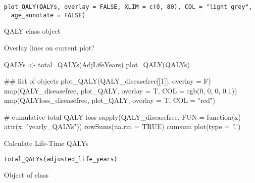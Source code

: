 \documentclass[a4paper]{book}
\begin{document}
%
\begin{Usage}
\begin{verbatim}
plot_QALY(QALYs, overlay = FALSE, XLIM = c(0, 80), COL = "light grey",
  age_annotate = FALSE)
\end{verbatim}
\end{Usage}
%
\begin{Arguments}
\begin{ldescription}
\item[\code{QALYs}] QALY class object

\item[\code{overlay}] Overlay lines on current plot?

\item[\code{age\_annotate}] 
\end{ldescription}
\end{Arguments}
%
\begin{SeeAlso}\relax
{}
\end{SeeAlso}
%
\begin{Examples}
\begin{ExampleCode}
QALYs <- total_QALYs(AdjLifeYears)
plot_QALY(QALYs)

## list of objects
plot_QALY(QALY_diseasefree[[1]], overlay = F)
map(QALY_diseasefree, plot_QALY, overlay = T, COL = rgb(0, 0, 0, 0.1))
map(QALYloss_diseasefree, plot_QALY, overlay = T, COL = "red")

# cumulative total QALY loss
sapply(QALY_diseasefree,
       FUN = function(x) attr(x, "yearly_QALYs")) %
       rowSums(na.rm = TRUE) %
       cumsum %
       plot(type = 'l')

\end{ExampleCode}
\end{Examples}
%
\begin{Description}\relax
Calculate Life-Time QALYs
\end{Description}
%
\begin{Usage}
\begin{verbatim}
total_QALYs(adjusted_life_years)
\end{verbatim}
\end{Usage}
%
\begin{Arguments}
\begin{ldescription}
\item[\code{adjusted\_life\_years}] Object of class 
\end{ldescription}
\end{Arguments}
\end{document}
